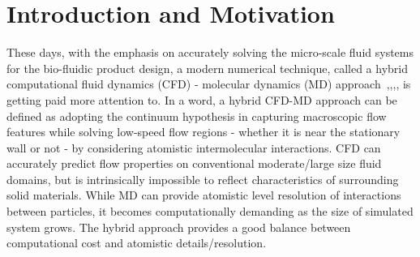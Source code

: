 \documentclass[conference,final]{IEEEtran}
\newcommand{\skonote}[1]{ {\textcolor{blue} { ***Jeff: #1 }}}
\newcommand{\skonote}[1]{}
\newcommand{\up}{\vspace*{-1em}}
\begin{document}
\begin{abstract}
\end{abstract}
\up\up


\section{Introduction and Motivation}

These days, with the emphasis on accurately solving the micro-scale fluid systems for the bio-fluidic product design, a modern numerical technique, called a hybrid computational fluid dynamics (CFD) - molecular dynamics (MD) approach~\cite{Thompson},\cite{Nie},\cite{Yen},\cite{Steijl}, is getting paid more attention to. In a word, a hybrid CFD-MD approach can be defined as adopting the continuum hypothesis in capturing macroscopic flow features while solving low-speed flow regions - whether it is near the stationary wall or not - by considering atomistic intermolecular interactions. CFD can accurately predict flow properties on conventional moderate/large size fluid domains, but is intrinsically impossible to reflect characteristics of surrounding solid materials. While MD can provide atomistic level resolution of interactions between particles, it becomes computationally demanding as the size of simulated system grows. The hybrid approach provides a good balance between computational cost and atomistic details/resolution.
\newline
\end{document}
